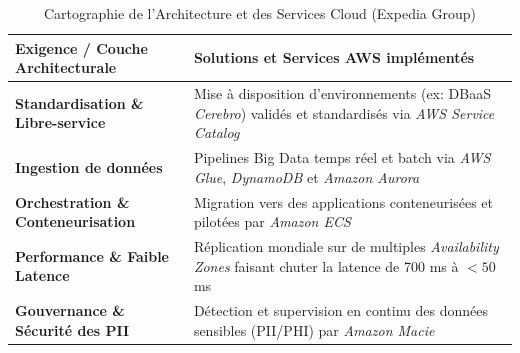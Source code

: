 \begin{table}[H]
\centering
\caption{Cartographie de l'Architecture et des Services Cloud (Expedia Group)}
\label{tab:expedia_mapping}
\renewcommand{\arraystretch}{1.3}
\begin{tabular}{|p{5.5cm}|p{8.5cm}|}
\hline
\rowcolor{darkgreen!20} \textbf{Exigence / Couche Architecturale} & \textbf{Solutions et Services AWS implémentés} \\ \hline
\textbf{Standardisation \& Libre-service} & Mise à disposition d'environnements (ex: DBaaS \textit{Cerebro}) validés et standardisés via \textit{AWS Service Catalog} \cite{81} \\ \hline
\textbf{Ingestion de données} & Pipelines Big Data temps réel et batch via \textit{AWS Glue}, \textit{DynamoDB} et \textit{Amazon Aurora} \cite{81} \\ \hline
\textbf{Orchestration \& Conteneurisation} & Migration vers des applications conteneurisées et pilotées par \textit{Amazon ECS} \cite{78, 81} \\ \hline
\textbf{Performance \& Faible Latence} & Réplication mondiale sur de multiples \textit{Availability Zones} faisant chuter la latence de 700 ms à $< 50$ ms \cite{78} \\ \hline
\textbf{Gouvernance \& Sécurité des PII} & Détection et supervision en continu des données sensibles (PII/PHI) par \textit{Amazon Macie} \cite{81} \\ \hline
\end{tabular}
\end{table}



